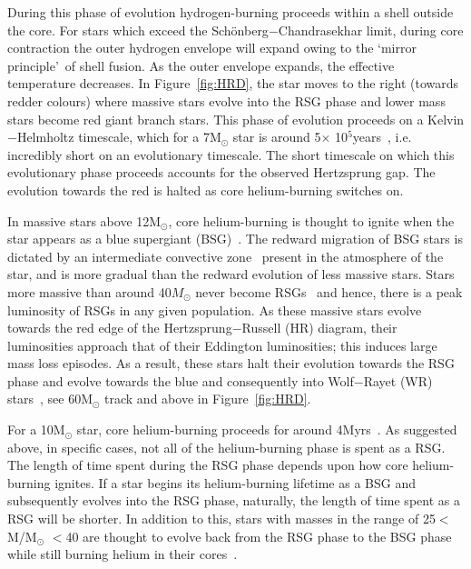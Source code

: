 During this phase of evolution hydrogen-burning proceeds within a shell outside the core.
For stars which exceed the Sch\"onberg$-$Chandrasekhar limit, during core contraction the outer hydrogen envelope will expand owing to the \textquoteleft mirror principle\textquoteright ~of shell fusion.\footnotemark
{}
As the outer envelope expands, the effective temperature decreases.
In Figure~\ref{fig:HRD}, the star moves to the right (towards redder colours) where massive stars evolve into the RSG phase and lower mass stars become red giant branch stars.
This phase of evolution proceeds on a Kelvin$-$Helmholtz timescale, which for a 7M$_{\odot}$ star is around 5$\times$ 10$^{5}$years~\citep{b:KippenhahnWeigert}, i.e. incredibly short on an evolutionary timescale.
The short timescale on which this evolutionary phase proceeds accounts for the observed Hertzsprung gap.
The evolution towards the red is halted as core helium-burning switches on.

In massive stars above 12M$_{\odot}$, core helium-burning is thought to ignite when the star appears as a blue supergiant (BSG)~\citep{Meynet11,2012A&A...537A.146E,Langer12,Saio13}.
The redward migration of BSG stars is dictated by an intermediate convective zone~\citep{Meynet11} present in the atmosphere of the star, and is more gradual than the redward evolution of less massive stars.
Stars more massive than around 40$M_{\odot}$ never become RSGs~\citep{Massey03,Meynet11,2012A&A...537A.146E} and hence, there is a peak luminosity of RSGs in any given population.
As these massive stars evolve towards the red edge of the Hertzsprung$-$Russell (HR) diagram, their luminosities approach that of their Eddington luminosities; this induces large mass loss episodes.
As a result, these stars halt their evolution towards the RSG phase and evolve towards the blue and consequently into Wolf$-$Rayet (WR) stars~\citep{Crowther07, Vink09}, see 60M$_{\odot}$ track and above in Figure~\ref{fig:HRD}.

For a 10M$_{\odot}$ star, core helium-burning proceeds for around 4Myrs~\citep{b:SalarisCassisi05}.
As suggested above, in specific cases, not all of the helium-burning phase is spent as a RSG.
The length of time spent during the RSG phase depends upon how core helium-burning ignites.
If a star begins its helium-burning lifetime as a BSG and subsequently evolves into the RSG phase, naturally, the length of time spent as a RSG will be shorter.
In addition to this, stars with masses in the range of 25$<$M/M$_{\odot}$ $<$40 are thought to evolve back from the RSG phase to the BSG phase while still burning helium in their cores~\citep{2012A&A...537A.146E}.

